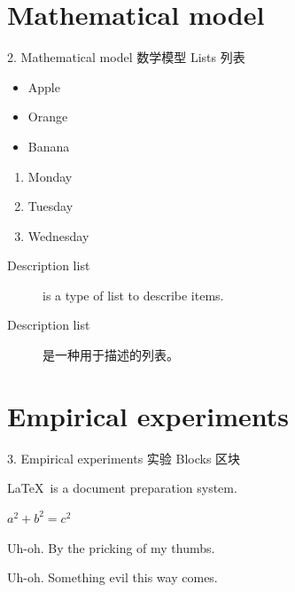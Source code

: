 \documentclass[CJKutf8]{beamer}
\begin{document}
\begin{CJK*}{UTF8}{gbsn}
  \section{Mathematical model}
  \label{Sec:model}
  \begin{frame}{2. Mathematical model 数学模型}
    Lists 列表

    \begin{itemize}
    \item Apple
    \item Orange
    \item Banana
    \end{itemize}

    \begin{enumerate}
    \item Monday
    \item Tuesday
    \item Wednesday
    \end{enumerate}

    \begin{description}
    \item[Description list] is a type of list to describe items.
    \item[Description list] 是一种用于描述的列表。
    \end{description}
  \end{frame} %

  \section{Empirical experiments}
  \label{Sec:experiments}
  \begin{frame}{3. Empirical experiments 实验}
    Blocks 区块

      \begin{definition}[\LaTeX]
        \LaTeX \ is a document preparation system.
      \end{definition}

      \begin{theorem}
        $a^2 + b^2 = c^2$
      \end{theorem}

      \begin{alertblock}{Uh-oh.}
        By the pricking of my thumbs.
      \end{alertblock}

      \begin{exampleblock}{Uh-oh.}
        Something evil this way comes.
      \end{exampleblock}


\end{frame}
\end{CJK*}
\end{document}
